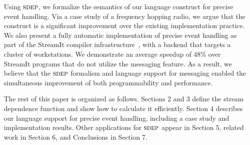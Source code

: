 Using $\textsc{sdep}$, we formalize the semantics of our language construct
for precise event handling.  Via a case study of a frequency hopping
radio, we argue that the construct is a significant improvement over
the existing implementation practice.  We also present a fully
automatic implementation of precise event handling as part of the
StreamIt compiler infrastructure~\cite{streamitcc,streamit-asplos},
with a backend that targets a cluster of workstations.  We demonstrate
an average speedup of 48\% over StreamIt programs that do not utilize
the messaging feature.  As a result, we believe that the $\textsc{sdep}$
formalism and language support for messaging enabled the simultaneous
improvement of both programmability and performance.

The rest of this paper is organized as follows.  Sections 2 and 3
define the stream dependence function and show how to calculate it
efficiently.  Section 4 describes our language support for precise
event handling, including a case study and implementation results.
Other applications for $\textsc{sdep}$ appear in Section 5, related work in
Section 6, and Conclusions in Section 7.


				   
